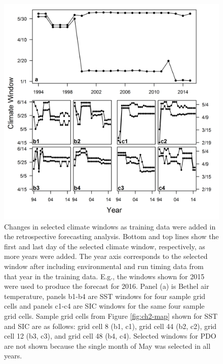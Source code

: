 \documentclass[12pt,]{book}
\theoremstyle{definition}
\theoremstyle{definition}
\theoremstyle{definition}
\theoremstyle{remark}
\begin{document}
\begin{figure}
  \centering
  \includegraphics{img/Ch2/window-changes.png}
  \caption{Changes in selected climate windows as training data were added in the retrospective forecasting analysis. Bottom and top lines show the first and last day of the selected climate window, respectively, as more years were added. The year axis corresponds to the selected window after including environmental and run timing data from that year in the training data. E.g., the windows shown for 2015 were used to produce the forecast for 2016. Panel (a) is Bethel air temperature, panels b1-b4 are SST windows for four sample grid cells and panels c1-c4 are SIC windows for the same four sample grid cells. Sample grid cells from Figure \ref{fig:ch2-map} shown for SST and SIC are as follows: grid cell 8 (b1, c1), grid cell 44 (b2, c2), grid cell 12 (b3, c3), and grid cell 48 (b4, c4). Selected windows for PDO are not shown because the single month of May was selected in all years.}
  \label{fig:window-changes}
\end{figure}

\pagebreak
\end{document}
